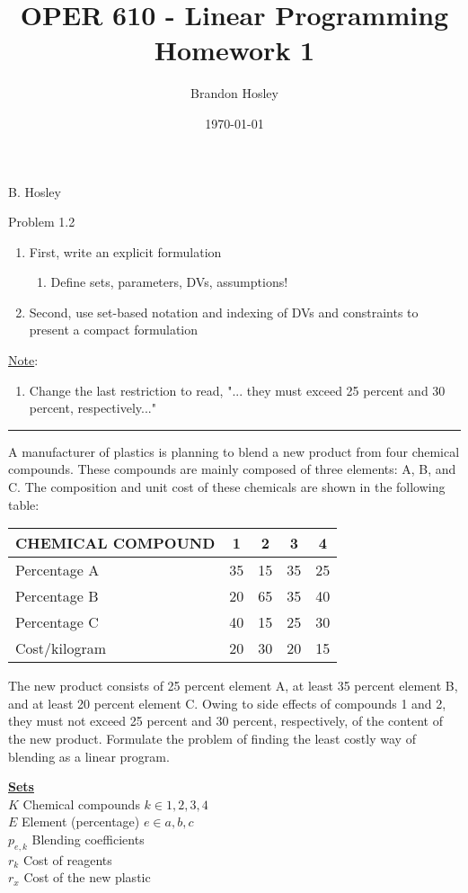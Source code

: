 \documentclass[answers]{exam}
\title{OPER 610 - Linear Programming%
	\\ Homework 1}
\author{Brandon Hosley}
\date{\today}
\begin{document}
\hspace{\fill} { B. Hosley}
\bigskip

\begin{questions}

\question 
Problem 1.2
\begin{enumerate}
	\item First, write an explicit formulation
	\begin{enumerate}
		\item Define sets, parameters, DVs, assumptions!
	\end{enumerate}
\item Second, use set-based notation and indexing of DVs and constraints to present a compact formulation
\end{enumerate}
\underline{Note}:
\begin{enumerate}
	\item Change the last restriction to read, "... they must exceed 25 percent and 30 percent, respectively..."
\end{enumerate}
\hrule
A manufacturer of plastics is planning to blend a new product from four chemical compounds. These compounds are mainly composed of three elements: A, B, and C. The composition and unit cost of these chemicals are shown in the following table:
\begin{tabular}{lcccc}
	\toprule
	CHEMICAL COMPOUND & 1 & 2 & 3 & 4 \\
	\midrule
	Percentage A  & 35 & 15 & 35 & 25 \\
	Percentage B  & 20 & 65 & 35 & 40 \\
	Percentage C  & 40 & 15 & 25 & 30 \\
	Cost/kilogram & 20 & 30 & 20 & 15 \\
	\bottomrule 
\end{tabular}
The new product consists of 25 percent element A, at least 35 percent element B, and at least 20 percent element C. Owing to side effects of compounds 1 and 2, they must not exceed 25 percent and 30 percent, respectively, of the content of the new product. Formulate the problem of finding the least costly way of blending as a linear program.
\begin{solution}
	\textbf{\underline{Sets}} \\
	\(K\) Chemical compounds \(k\in{1,2,3,4}\) \\
	\(E\) Element (percentage) \(e\in{a,b,c}\) \\
	\(p_{e,k}\) Blending coefficients \\
	\(r_{k}\) Cost of reagents \\
	\(r_{x}\) Cost of the new plastic \\
	

\end{solution}
\end{questions}
\end{document}

